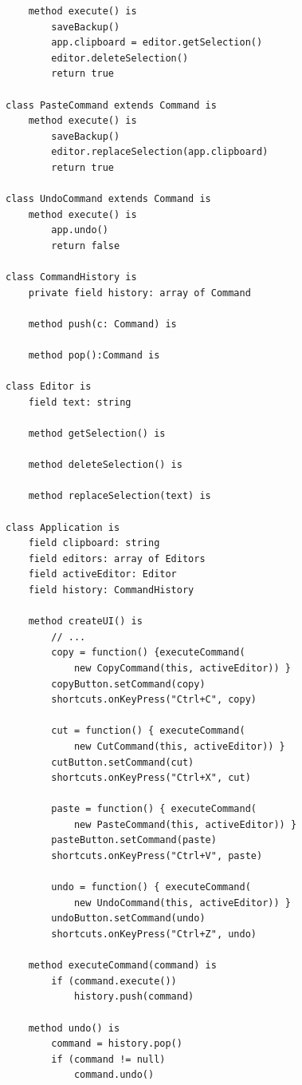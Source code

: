 \documentclass[12pt, a4paper]{book}%
\begin{document}
{\begin{lstlisting}
    method execute() is
        saveBackup()
        app.clipboard = editor.getSelection()
        editor.deleteSelection()
        return true

class PasteCommand extends Command is
    method execute() is
        saveBackup()
        editor.replaceSelection(app.clipboard)
        return true

class UndoCommand extends Command is
    method execute() is
        app.undo()
        return false

class CommandHistory is
    private field history: array of Command

    method push(c: Command) is

    method pop():Command is

class Editor is
    field text: string

    method getSelection() is

    method deleteSelection() is

    method replaceSelection(text) is

class Application is
    field clipboard: string
    field editors: array of Editors
    field activeEditor: Editor
    field history: CommandHistory

    method createUI() is
        // ...
        copy = function() {executeCommand(
            new CopyCommand(this, activeEditor)) }
        copyButton.setCommand(copy)
        shortcuts.onKeyPress("Ctrl+C", copy)

        cut = function() { executeCommand(
            new CutCommand(this, activeEditor)) }
        cutButton.setCommand(cut)
        shortcuts.onKeyPress("Ctrl+X", cut)

        paste = function() { executeCommand(
            new PasteCommand(this, activeEditor)) }
        pasteButton.setCommand(paste)
        shortcuts.onKeyPress("Ctrl+V", paste)

        undo = function() { executeCommand(
            new UndoCommand(this, activeEditor)) }
        undoButton.setCommand(undo)
        shortcuts.onKeyPress("Ctrl+Z", undo)

    method executeCommand(command) is
        if (command.execute())
            history.push(command)

    method undo() is
        command = history.pop()
        if (command != null)
            command.undo()
\end{lstlisting}

}
\end{document}
